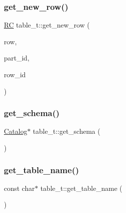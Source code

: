 \subsubsection{\texorpdfstring{get\+\_\+new\+\_\+row()}{get\_new\_row()}\hspace{0.1cm}{\footnotesize\ttfamily [2/2]}}
{\footnotesize\ttfamily \hyperlink{global_8h_a78c49a674c810fdd03d20432f7be864a}{RC} table\+\_\+t\+::get\+\_\+new\+\_\+row (\begin{DoxyParamCaption}\item[{\hyperlink{classrow__t}{row\+\_\+t} $\ast$\&}]{row,  }\item[{uint64\+\_\+t}]{part\+\_\+id,  }\item[{uint64\+\_\+t \&}]{row\+\_\+id }\end{DoxyParamCaption})}

\mbox{\label{classtable__t_a8ac1dd0bce278f742c1caa28fcd35b70}} 
\subsubsection{\texorpdfstring{get\+\_\+schema()}{get\_schema()}}
{\footnotesize\ttfamily \hyperlink{classCatalog}{Catalog}$\ast$ table\+\_\+t\+::get\+\_\+schema (\begin{DoxyParamCaption}{ }\end{DoxyParamCaption})\hspace{0.3cm}{\ttfamily [inline]}}

\mbox{\label{classtable__t_a094de1bb6ed142eb1c12044b34ec28e3}} 
\subsubsection{\texorpdfstring{get\+\_\+table\+\_\+name()}{get\_table\_name()}}
{\footnotesize\ttfamily const char$\ast$ table\+\_\+t\+::get\+\_\+table\+\_\+name (\begin{DoxyParamCaption}{ }\end{DoxyParamCaption})\hspace{0.3cm}{\ttfamily [inline]}}

\mbox{\label{classtable__t_ae65abd8e531e3e86877868ed2851f9df}} 
